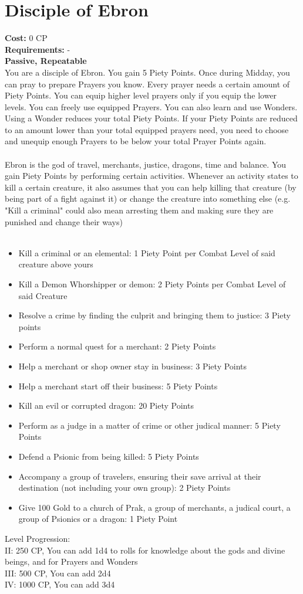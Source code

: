 \section{Disciple of Ebron}
\textbf{Cost:} 0 CP\\
\textbf{Requirements:} - \\
\textbf{Passive, Repeatable}\\
You are a disciple of Ebron. You gain 5 Piety Points. Once during Midday, you can pray to prepare Prayers you know. Every prayer needs a certain amount of Piety Points. You can equip higher level prayers only if you equip the lower levels. You can freely use equipped Prayers. You can also learn and use Wonders. Using a Wonder reduces your total Piety Points. If your Piety Points are reduced to an amount lower than your total equipped prayers need, you need to choose and unequip enough Prayers to be below your total Prayer Points again.\\
\\
Ebron is the god of travel, merchants, justice, dragons, time and balance. You gain Piety Points by performing certain activities. Whenever an activity states to kill a certain creature, it also assumes that you can help killing that creature (by being part of a fight against it) or change the creature into something else (e.g. "Kill a criminal" could also mean arresting them and making sure they are punished and change their ways)\\
\\
\begin{itemize}
	\item Kill a criminal or an elemental: 1 Piety Point per Combat Level of said creature above yours
	\item Kill a Demon Whorshipper or demon: 2 Piety Points per Combat Level of said Creature
	\item Resolve a crime by finding the culprit and bringing them to justice: 3 Piety points
	\item Perform a normal quest for a merchant: 2 Piety Points
	\item Help a merchant or shop owner stay in business: 3 Piety Points
	\item Help a merchant start off their business: 5 Piety Points
	\item Kill an evil or corrupted dragon: 20 Piety Points
	\item Perform as a judge in a matter of crime or other judical manner: 5 Piety Points
	\item Defend a Psionic from being killed: 5 Piety Points
	\item Accompany a group of travelers, ensuring their save arrival at their destination (not including your own group): 2 Piety Points
	\item Give 100 Gold to a church of Prak, a group of merchants, a judical court, a group of Psionics or a dragon: 1 Piety Point
\end{itemize}

Level Progression:\\
II: 250 CP, You can add 1d4 to rolls for knowledge about the gods and divine beings, and for Prayers and Wonders\\
III: 500 CP, You can add 2d4\\
IV: 1000 CP, You can add 3d4\\